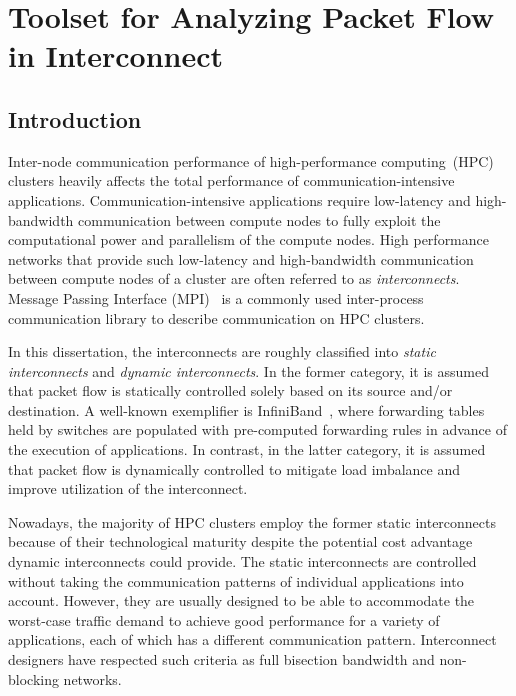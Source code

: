 \chapter{Toolset for Analyzing Packet Flow in Interconnect}\label{sec:ii}

\section{Introduction}\label{sec:ii-introduction}

Inter-node communication performance of high-performance computing~(HPC)
clusters heavily affects the total performance of
communication-intensive applications. Communication-intensive
applications require low-latency and high-bandwidth communication
between compute nodes to fully exploit the computational power and
parallelism of the compute nodes. High performance networks that
provide such low-latency and high-bandwidth communication between
compute nodes of a cluster are often referred to as
\emph{interconnects}. Message Passing Interface
(MPI)~\autocite{MessagePassingInterfaceForum2015,Gropp2014} is a
commonly used inter-process communication library to describe
communication on HPC clusters.

In this dissertation, the interconnects are roughly classified into
\emph{static interconnects} and \emph{dynamic interconnects}. In the former
category, it is assumed that packet flow is statically controlled solely based
on its source and/or destination. A well-known exemplifier is
InfiniBand~\autocite{Buyya2009}, where forwarding tables held by switches are
populated with pre-computed forwarding rules in advance of the execution of
applications. In contrast, in the latter category, it is assumed that packet
flow is dynamically controlled to mitigate load imbalance and improve
utilization of the interconnect.

Nowadays, the majority of HPC clusters employ the former static interconnects
because of their technological maturity despite the potential cost advantage
dynamic interconnects could provide. The static interconnects are controlled
without taking the communication patterns of individual applications into
account. However, they are usually designed to be able to accommodate the
worst-case traffic demand to achieve good performance for a variety of
applications, each of which has a different communication pattern.
Interconnect designers have respected such criteria as full bisection
bandwidth and non-blocking networks.

